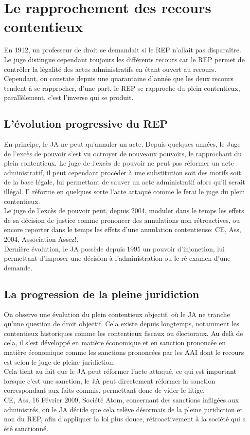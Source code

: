 \documentclass[10pt, a4paper, openany]{book}
\begin{document}
\section{Le rapprochement des recours contentieux}

En 1912, un professeur de droit se demandait si le REP n'allait pas disparaître. Le juge distingue cependant toujours les différents recours car le REP permet de contrôler la légalité des actes administratifs en étant ouvert au recours. Cependant, on constate depuis une quarantaine d'année que les deux recours tendent à se rapprocher, d'une part, le REP se rapproche du plein contentieux, parallèlement, c'est l'inverse qui se produit. 

\subsection{L'évolution progressive du REP}

En principe, le JA ne peut qu'annuler un acte. Depuis quelques années, le Juge de l'excès de pouvoir s'est vu octroyer de nouveaux pouvoirs, le rapprochant du plein contentieux. Le juge de l'excès de pouvoir ne peut pas réformer un acte administratif, il peut cependant procéder à une substitution soit des motifs soit de la base légale, lui permettant de sauver un acte administratif alors qu'il serait illégal. Il réforme en quelques sorte l'acte attaqué comme le ferai le juge du plein contentieux. \\
Le juge de l'excès de pouvoir peut, depuis 2004, moduler dans le temps les effets de sa décision de justice comme prononcer des annulations non rétroactives, ou encore reporter dans le temps les effets d'une annulation contentieuse: CE, Ass, 2004, Association Assez!. \\
Dernière évolution, le JA possède depuis 1995 un pouvoir d'injonction, lui permettant d'imposer une décision à l'administration ou le ré-examen d'une demande. 

\subsection{La progression de la pleine juridiction}

On observe une évolution du plein contentieux objectif, où le JA ne tranche qu'une question de droit objectif. Cela existe depuis longtemps, notamment les contentieux historiques comme les contentieux fiscaux ou électoraux. Au delà de cela, il s'est développé en matière économique et en sanction prononcée en matière économique comme les sanctions prononcées par les AAI dont le recours est selon le juge de pleine juridiction. \\
Cela tient au fait que le JA peut réformer l'acte attaqué, ce qui est important lorsque c'est une sanction, le JA peut directement réformer la sanction correspondant aux faits commis, permettant donc de vider le litige. \\
CE, Ass, 16 Février 2009, Société Atom, concernant des sanctions infligées aux administrés, où le JA décide que cela relève désormais de la pleine juridiction et non du REP, afin d'appliquer la loi plus douce, rétroactivement à la société qui a été sanctionné. 
\end{document}
